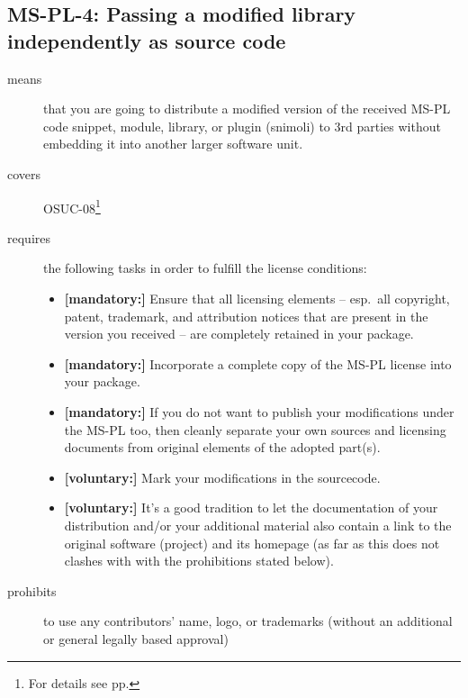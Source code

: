 \subsection{MS-PL-4: Passing a modified library independently as source code}
\label{OSUC-08-MS-PL}
\begin{description}
\item[means] that you are going to distribute a modified version of the received
MS-PL code snippet, module, library, or plugin (snimoli) to 3rd parties without
embedding it into another larger software unit.
\item[covers] OSUC-08\footnote{For details see pp. \pageref{OSUC-08-DEF}}
\item[requires] the following tasks in order to fulfill the license conditions:

\begin{itemize}
  \item \textbf{[mandatory:]} Ensure that all licensing elements -- esp.\ all
  copyright, patent, trademark, and attribution notices that are present in the
  version you received -- are completely retained in your package.
 
  \item \textbf{[mandatory:]} Incorporate a complete copy of the MS-PL license
  into your package.
  
  \item \textbf{[mandatory:]} If you do not want to publish your modifications
  under the MS-PL too, then cleanly separate your own sources and licensing
  documents from original elements of the adopted part(s).
  
  \item \textbf{[voluntary:]} Mark your modifications in the sourcecode.
  
  \item \textbf{[voluntary:]} It's a good tradition to let the documentation of
  your distribution and/or your additional material also contain a link to the
  original software (project) and its homepage (as far as this does not clashes
  with with the prohibitions stated below).
  
\end{itemize}

\item[prohibits] to use any contributors' name, logo, or trademarks (without an
additional or general legally based approval)

\end{description}

